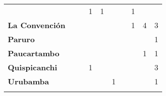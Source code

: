 \begin{tabular}{lccccccccc}
	&\cellcolor[HTML]{FCC46C} 					&\cellcolor[HTML]{FCC46C} 		 
	&1											&1									
	&\cellcolor[HTML]{FCC46C}				    &\cellcolor[HTML]{FCC46C}
	&1 					&\cellcolor[HTML]{FCC46C}
	&\cellcolor[HTML]{FCC46C} \\
	\textbf{La Convención}                      
	&\cellcolor[HTML]{FCC46C}              		&\cellcolor[HTML]{FCC46C} 			
	&\cellcolor[HTML]{FCC46C}					&\cellcolor[HTML]{FCC46C}  					&\cellcolor[HTML]{FCC46C} 		            &\cellcolor[HTML]{FCC46C} 					
	&1 											&4
	&3\\
	\textbf{Paruro}                            
	&\cellcolor[HTML]{FCC46C}              	    &\cellcolor[HTML]{FCC46C}        			&\cellcolor[HTML]{FCC46C}                   &\cellcolor[HTML]{FCC46C}   				&\cellcolor[HTML]{FCC46C} 					&\cellcolor[HTML]{FCC46C}		 			&\cellcolor[HTML]{FCC46C}					&\cellcolor[HTML]{FCC46C}
	&1\\
	\textbf{Paucartambo}               		                       
	&\cellcolor[HTML]{FCC46C} 					&\cellcolor[HTML]{FCC46C}					&\cellcolor[HTML]{FCC46C}					
	&\cellcolor[HTML]{FCC46C}					&\cellcolor[HTML]{FCC46C}                   &\cellcolor[HTML]{FCC46C} 					&\cellcolor[HTML]{FCC46C}
	&1											&1\\
	\textbf{Quispicanchi}                                         	                  
	&\cellcolor[HTML]{FCC46C} 					
	&\cellcolor[HTML]{FCC46C}					&1
	&\cellcolor[HTML]{FCC46C}					&\cellcolor[HTML]{FCC46C} 
	&\cellcolor[HTML]{FCC46C}					&\cellcolor[HTML]{FCC46C}
	&\cellcolor[HTML]{FCC46C}					&3\\
	\textbf{Urubamba}                                                    
    &\cellcolor[HTML]{FCC46C}      
	&\cellcolor[HTML]{FCC46C}					&\cellcolor[HTML]{FCC46C}		
	&\cellcolor[HTML]{FCC46C}					&1
	&\cellcolor[HTML]{FCC46C}					&\cellcolor[HTML]{FCC46C}
	&\cellcolor[HTML]{FCC46C}					&1\\
	&\multicolumn{1}{l}{}                       &\multicolumn{1}{l}{}            &\multicolumn{1}{l}{}                         
	&\multicolumn{1}{l}{}                       &\multicolumn{1}{l}{}            &\multicolumn{1}{l}{}                       &\multicolumn{1}{l}{}                       &\multicolumn{1}{l}{}            &\multicolumn{1}{l}{}    
\end{tabular}
